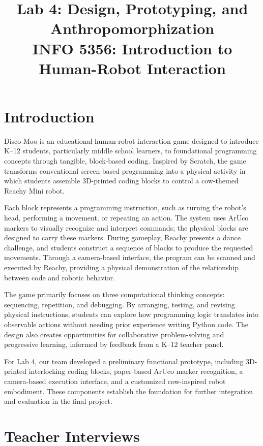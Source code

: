 \documentclass[conference]{IEEEtran}
\title{Lab 4: Design, Prototyping, and Anthropomorphization\\
\large INFO 5356: Introduction to Human-Robot Interaction}
\author{
\IEEEauthorblockN{Elliot Zhang, Yifan (Fanning) Luo, Jaclyn Pham, Jiaxin (Aurora) Shen}
\IEEEauthorblockA{Cornell Tech\\
\{qz432, yl4389, cqp4, js3996\}@cornell.edu}
}
\begin{document}
\maketitle


\section{Introduction}

Disco Moo is an educational human-robot interaction game designed to introduce K--12 students, particularly middle school learners, to foundational programming concepts through tangible, block-based coding. Inspired by Scratch, the game transforms conventional screen-based programming into a physical activity in which students assemble 3D-printed coding blocks to control a cow-themed Reachy Mini robot.

Each block represents a programming instruction, such as turning the robot's head, performing a movement, or repeating an action. The system uses ArUco markers to visually recognize and interpret commands; the physical blocks are designed to carry these markers. During gameplay, Reachy presents a dance challenge, and students construct a sequence of blocks to produce the requested movements. Through a camera-based interface, the program can be scanned and executed by Reachy, providing a physical demonstration of the relationship between code and robotic behavior.

The game primarily focuses on three computational thinking concepts: sequencing, repetition, and debugging. By arranging, testing, and revising physical instructions, students can explore how programming logic translates into observable actions without needing prior experience writing Python code. The design also creates opportunities for collaborative problem-solving and progressive learning, informed by feedback from a K--12 teacher panel.

For Lab 4, our team developed a preliminary functional prototype, including 3D-printed interlocking coding blocks, paper-based ArUco marker recognition, a camera-based execution interface, and a customized cow-inspired robot embodiment. These components establish the foundation for further integration and evaluation in the final project.



\section{Teacher Interviews}
\end{document}
